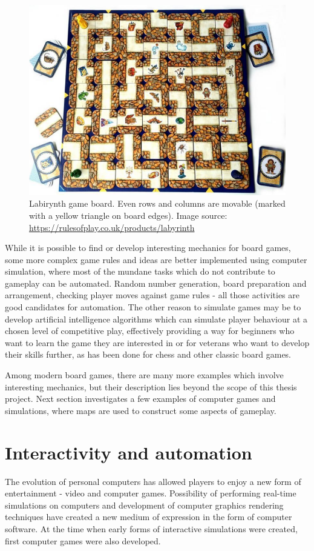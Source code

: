 \documentclass[12pt]{report}
\begin{document}
 \begin{figure}[h]
 	\centering
 	\includegraphics[width=0.7\linewidth]{images/labirynth}
 	\caption{Labirynth game board. Even rows and columns are movable (marked with a yellow triangle on board edges). Image source: \url{https://rulesofplay.co.uk/products/labyrinth} }
 	\label{fig:carcassonne}
 \end{figure}


While it is possible to find or develop interesting mechanics for board games, some more complex game rules and ideas are better implemented using computer simulation, where most of the mundane tasks which do not contribute to gameplay can be automated. Random number generation, board preparation and arrangement, checking player moves against game rules - all those activities are good candidates for automation. The other reason to simulate games may be to develop artificial intelligence algorithms which can simulate player behaviour at a chosen level of competitive play, effectively providing a way for beginners who want to learn the game they are interested in or for veterans who want to develop their skills further, as has been done for chess and other classic board games. 

Among modern board games, there are many more examples which involve interesting mechanics, but their description lies beyond the scope of this thesis project. Next section investigates a few examples of computer games and simulations, where maps are used to construct some aspects of gameplay.

\section{Interactivity and automation }

The evolution of personal computers has allowed players to enjoy a new form of entertainment - video and computer games. Possibility of performing real-time simulations on computers and development of computer graphics rendering techniques have created a new medium of expression in the form of computer software. At the time when early forms of interactive simulations were created, first computer games were also developed. 
\end{document}
